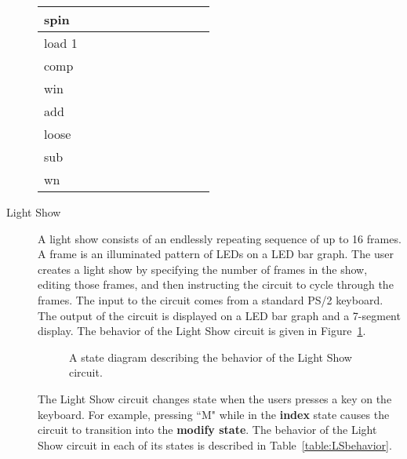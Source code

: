 \begin{description}
\begin{landscape}
\begin{table}
{\begin{tabular}{l|l|l|l|l|l|l|l|l|l|l}
spin  &       &       &       & 	      &         &       &       &        &       & \\ \hline
load 1&       &       &       & 	      &         &       &       &        &       & \\ \hline
comp  &       &       &       & 	      &         &       &       &        &       & \\ \hline
win   &       &       &       & 	      &         &       &       &        &       & \\ \hline
add   &       &       &       & 	      &         &       &       &        &       & \\ \hline
loose &       &       &       & 	      &         &       &       &        &       & \\ \hline
sub &       &       &       & 	      &         &       &       &        &       & \\ \hline
wn    &       &       &       & 	      &         &       &       &        &       & \\ 
\end{tabular}
}
\end{table}
\end{landscape}


\item[Light Show]

A light show consists of an endlessly repeating sequence of up to 16 frames. 
A frame is an illuminated pattern of LEDs on a LED bar graph. The user 
creates a light show by specifying the number of frames in the show, editing 
those frames, and then instructing the circuit to cycle through the frames. 
The input to the circuit comes from a standard PS/2 keyboard. The output of 
the circuit is displayed on a LED bar graph and a 7-segment display. The 
behavior of the Light Show circuit is given in Figure~\ref{fig:LSbehavior}.
 
\begin{figure}[ht]
\caption{A state diagram describing the behavior of the Light Show circuit.}
\label{fig:LSbehavior}
\end{figure}

The Light Show circuit changes state when the users presses a key on 
the keyboard. For example, pressing ``M" while in the \textbf{ index } state causes 
the circuit to transition into the \textbf{ modify state}. The behavior of the 
Light Show circuit in each of its states is described in 
Table~\ref{table:LSbehavior}.


\end{description}
